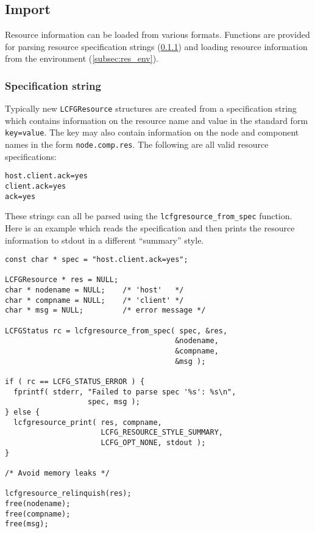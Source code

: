 \documentclass[11pt,a4paper,titlepage]{article}
\begin{document}
\subsection{Import}

Resource information can be loaded from various formats. Functions are
provided for parsing resource specification strings
(\ref{subsec:res_spec}) and loading resource information from the
environment (\ref{subsec:res_env}).

\subsubsection{Specification string}
\label{subsec:res_spec}

Typically new \texttt{LCFGResource} structures are created from a
specification string which contains information on the resource name
and value in the standard form \texttt{key=value}. The key may also
contain information on the node and component names in the form
\texttt{node.comp.res}. The following are all valid resource
specifications:

\begin{verbatim}
host.client.ack=yes
client.ack=yes
ack=yes
\end{verbatim}

These strings can all be parsed using the
\texttt{lcfgresource\_from\_spec} function. Here is an example which
reads the specification and then prints the resource information to
stdout in a different ``summary'' style.

\begin{verbatim}
const char * spec = "host.client.ack=yes";

LCFGResource * res = NULL;
char * nodename = NULL;    /* 'host'   */
char * compname = NULL;    /* 'client' */
char * msg = NULL;         /* error message */

LCFGStatus rc = lcfgresource_from_spec( spec, &res,
                                       &nodename,
                                       &compname,
                                       &msg );

if ( rc == LCFG_STATUS_ERROR ) {
  fprintf( stderr, "Failed to parse spec '%s': %s\n",
                   spec, msg );
} else {
  lcfgresource_print( res, compname,
                      LCFG_RESOURCE_STYLE_SUMMARY,
                      LCFG_OPT_NONE, stdout );
}

/* Avoid memory leaks */

lcfgresource_relinquish(res);
free(nodename);
free(compname);
free(msg);
\end{verbatim}
\end{document}
